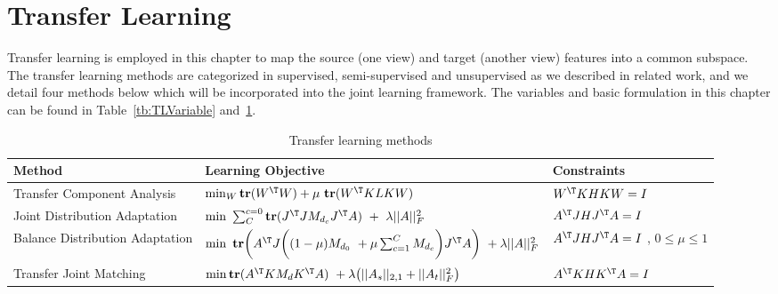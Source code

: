 \section{Transfer Learning}
Transfer learning is employed in this chapter to map the source (one view) and target (another view) features into a common subspace. The transfer learning methods are categorized in supervised, semi-supervised and unsupervised as we described in related work, and we detail four methods below which will be incorporated into the joint learning framework. The variables and  basic formulation in this chapter can be found in Table~\ref{tb:TLVariable} and~\ref{table:tcl}.
\begin{table}[h]
	\footnotesize
	\centering
	\caption{Transfer learning methods} 
	\begin{tabular}{|m{2cm}|m{9cm}|m{2.9cm}|}
		\hline   
		Method & Learning Objective & Constraints  \\ 
		\hline
		Transfer Component Analysis&  $\min_W \textbf{tr}(W^\T W) + \mu \ \textbf{tr}(W^\T KLKW)$ &$W^\T KHKW = I$\\ \hline
		Joint Distribution Adaptation&$\min\ \sum_{C}^{c=0} \textbf{tr}(J^\T JM_{d_c}J^\T A) \ + \ \lambda ||A||_F^2 $ & $A^\T JHJ^\T A= I$           \\ \hline
		Balance Distribution Adaptation&  $\min \  \textbf{tr} \bigg(A^\T J \bigg((1-\mu )M_{d_0} \ + \mu \sum_{c=1}^{C}M_{d_c}\bigg)J^\T A \bigg)\ +\lambda||A||_F^2$&$A^\T JHJ^\T A= I$ , $0\leq \mu \leq 1$         \\ \hline
		Transfer Joint Matching & $\min \textbf{tr}(A^\T KM_dK^\T A)\ +\lambda \big(||A_s||_{2,1} + ||A_t||_F^2 \big)$ &$A^\T KHK^\T A= I $           \\  \hline
	\end{tabular}%
	\label{table:tcl}
\end{table}